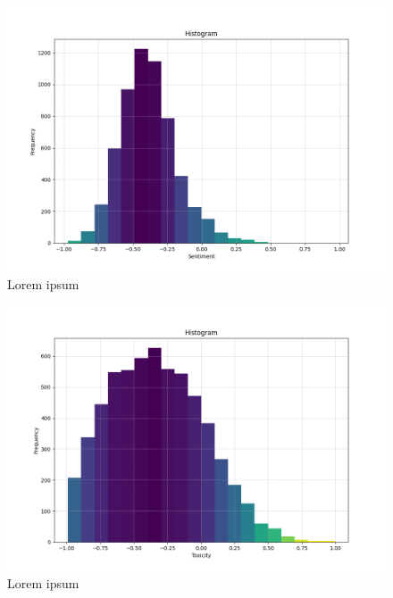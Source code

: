 \begin{figure}[!htb]
    \centering
    \includegraphics[width=\textwidth]{figures/sentiment_histogram.png}
    \caption[]{Lorem ipsum}
\end{figure}

\begin{figure}[!htb]
    \centering
    \includegraphics[width=\textwidth]{figures/toxicity_histogram.png}
    \caption[]{Lorem ipsum}
\end{figure}

